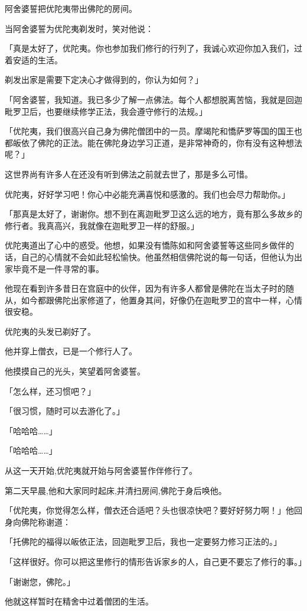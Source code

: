 \documentclass[twoside,openany]{book}
\begin{document}
阿舍婆誓把优陀夷带出佛陀的房间。

当阿舍婆誓为优陀夷剃发时，笑对他说：

「真是太好了，优陀夷。你也参加我们修行的行列了，我诚心欢迎你加入我们，过着安适的生活。

剃发出家是需要下定决心才做得到的，你认为如何？」

「阿舍婆誓，我知道。我已多少了解一点佛法。每个人都想脱离苦恼，我就是回迦毗罗卫后，也要继续修学正法，我会遵守修行的法规。」

「优陀夷，我们很高兴自己身为佛陀僧团中的一员。摩竭陀和憍萨罗等国的国王也都皈依了佛陀的正法。能在佛陀身边学习正道，是非常神奇的，你有没有这种想法呢？」

这世界尚有许多人在还没有听到佛法之前就去世了，那是多么可惜。

优陀夷，好好学习吧！你心中必能充满喜悦和感激的。我们也会尽力帮助你。」

「那真是太好了，谢谢你。想不到在离迦毗罗卫这么远的地方，竟有那么多故乡的修行者。我真高兴，我就像在迦毗罗卫一样的舒服。」

优陀夷道出了心中的惑受。他想，如果没有憍陈如和阿舍婆誓等这些同乡做伴的话，自己的心情就不会如此轻松愉快。他虽然相信佛陀说的每一句话，但他认为出家毕竟不是一件寻常的事。

他现在看到许多昔日在宫庭中的伙伴，因为有许多人都曾是佛陀在当太子时的随从，如今都跟佛陀出家修道了，他置身其间，好像仍在迦毗罗卫的宫中一样，心情很安稳。

优陀夷的头发已剃好了。

他并穿上僧衣，已是一个修行人了。

他摸摸自己的光头，笑望着阿舍婆誓。

「怎么样，还习惯吧？」

「很习惯，随时可以去游化了。」

「哈哈哈……」

「哈哈哈……」

从这一天开始,优陀夷就开始与阿舍婆誓作伴修行了。

第二天早晨,他和大家同时起床,并清扫房间,佛陀于身后唤他。

「优陀夷，你觉得怎么样，僧衣还合适吧？头也很凉快吧？要好好努力啊！」他回身向佛陀称谢道：

「托佛陀的福得以皈依正法，回迦毗罗卫后，我也一定要努力修习正法的。」

「这样很好。你可以把这里修行的情形告诉家乡的人，自己更不要忘了修行的事。」

「谢谢您，佛陀。」

他就这样暂时在精舍中过着僧团的生活。
\end{document}
